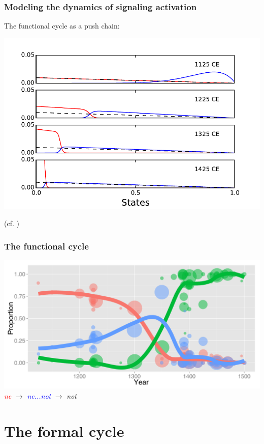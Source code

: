 \documentclass[compress]{beamer}
\begin{document}
\begin{frame}
\frametitle{Modeling the dynamics of signaling activation}
The functional cycle as a push chain:
	\begin{center}
		\includegraphics[width=.75\textwidth]{push-chain.pdf}
	\end{center}
	\vfill \hfill (cf. \cite{wallage2013})
\end{frame}

\begin{frame}
\frametitle{The functional cycle}
	\begin{center}
		\includegraphics[width=.75\textwidth]{neg-docs-lines.pdf}\\
		\emph{\textcolor{red}{ne}} $\rightarrow$ \emph{\textcolor{blue}{ne...not}} $\rightarrow$ \emph{\textcolor{mygreen}{not}}
	\end{center}
\end{frame}

\section{The formal cycle}
\end{document}
